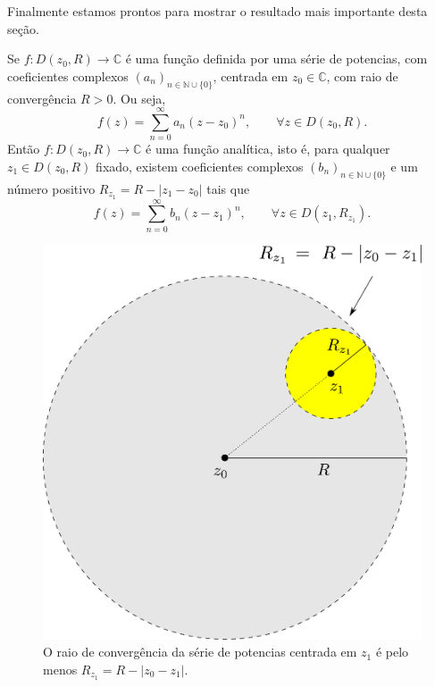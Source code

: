 Finalmente estamos prontos para mostrar o resultado mais importante
desta seção.

\bigskip 

\begin{teorema}\label{teo-series-pot-analiticas}
Se $f:D(z_0,R)\to\mathbb{C}$ é uma função definida 
por uma série de potencias, com coeficientes complexos 
$(a_n)_{n\in\mathbb{N}\cup\{0\}}$, centrada
em $z_0\in\mathbb{C}$, com raio de convergência $R>0$. Ou seja,
\[
f(z) = \sum_{n=0}^{\infty} a_n(z-z_0)^n, \qquad \forall z\in D(z_0,R).
\]
Então $f:D(z_0,R)\to\mathbb{C}$ é uma função analítica, isto é, 
para qualquer $z_1\in D(z_0,R)$ fixado, existem 
coeficientes complexos $(b_n)_{n\in\mathbb{N}\cup\{0\}}$ 
e um número positivo $R_{z_1}=R-|z_1-z_0|$
tais que 
\[
f(z) = \sum_{n=0}^{\infty} b_n(z-z_1)^n, \qquad \forall z\in D(z_1,R_{z_1}).
\] 
\end{teorema}

\begin{figure}[H]
\centering
\includegraphics[width=0.55\linewidth]{Figuras/Rz1-func-analitica}
\caption{O raio de convergência da série de potencias centrada em $z_1$ é pelo menos $R_{z_1}=R-|z_0-z_1|$.}
\label{fig:rz1-func-analitica}
\end{figure}


